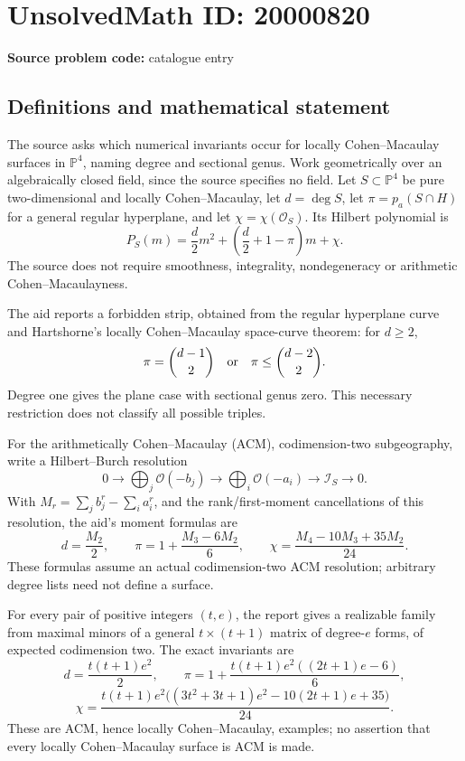 \documentclass[11pt]{article}
\newcommand{\PP}{\mathbb{P}}
\begin{document}
\section*{UnsolvedMath ID: 20000820}
\textbf{Source problem code:} catalogue entry
\subsection{Definitions and mathematical statement}
The source asks which numerical invariants occur for locally Cohen--Macaulay surfaces in $\PP^4$, naming degree and sectional genus. Work geometrically over an algebraically closed field, since the source specifies no field. Let $S\subset\PP^4$ be pure two-dimensional and locally Cohen--Macaulay, let $d=\deg S$, let $\pi=p_a(S\cap H)$ for a general regular hyperplane, and let $\chi=\chi(\mathcal O_S)$. Its Hilbert polynomial is
\[
 P_S(m)=\frac d2m^2+\left(\frac d2+1-\pi\right)m+\chi.
\]
The source does not require smoothness, integrality, nondegeneracy or arithmetic Cohen--Macaulayness.

The aid reports a forbidden strip, obtained from the regular hyperplane curve and Hartshorne's locally Cohen--Macaulay space-curve theorem: for $d\geq2$,
\[
 \pi=\binom{d-1}{2}\quad\hbox{or}\quad
 \pi\leq\binom{d-2}{2}.
\]
Degree one gives the plane case with sectional genus zero. This necessary restriction does not classify all possible triples.

For the arithmetically Cohen--Macaulay (ACM), codimension-two subgeography, write a Hilbert--Burch resolution
\[
 0\longrightarrow\bigoplus_j\mathcal O(-b_j)
 \longrightarrow\bigoplus_i\mathcal O(-a_i)
 \longrightarrow\mathcal I_S\longrightarrow0.
\]
With $M_r=\sum_j b_j^r-\sum_i a_i^r$, and the rank/first-moment cancellations of this resolution, the aid's moment formulas are
\[
 d=\frac{M_2}{2},\qquad
 \pi=1+\frac{M_3-6M_2}{6},\qquad
 \chi=\frac{M_4-10M_3+35M_2}{24}.
\]
These formulas assume an actual codimension-two ACM resolution; arbitrary degree lists need not define a surface.

For every pair of positive integers $(t,e)$, the report gives a realizable family from maximal minors of a general $t\times(t+1)$ matrix of degree-$e$ forms, of expected codimension two. The exact invariants are
\[
 d=\frac{t(t+1)e^2}{2},\qquad
 \pi=1+\frac{t(t+1)e^2((2t+1)e-6)}6,
\]
\[
 \chi=\frac{t(t+1)e^2\bigl((3t^2+3t+1)e^2-10(2t+1)e+35\bigr)}{24}.
\]
These are ACM, hence locally Cohen--Macaulay, examples; no assertion that every locally Cohen--Macaulay surface is ACM is made.
\end{document}
